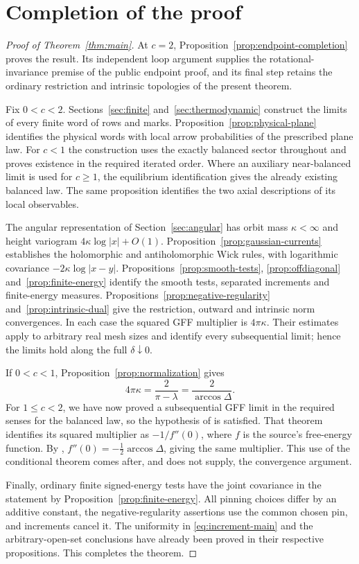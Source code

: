 \section{Completion of the proof}

\begin{proof}[Proof of Theorem~\ref{thm:main}]
At $c=2$, Proposition~\ref{prop:endpoint-completion} proves the result.
Its independent loop argument supplies the rotational-invariance
premise of the public endpoint proof, and its final step retains the
ordinary restriction and intrinsic topologies of the present theorem.

Fix \(0<c<2\). Sections~\ref{sec:finite}
and~\ref{sec:thermodynamic} construct the limits of every finite word
of rows and marks. Proposition~\ref{prop:physical-plane} identifies the
physical words with local arrow probabilities of the prescribed plane
law. For \(c<1\) the construction uses the exactly balanced sector
throughout and proves existence in the required iterated order. Where
an auxiliary near-balanced limit is used for \(c\ge1\), the equilibrium
identification gives the already existing balanced law. The same
proposition identifies the two axial descriptions of its local
observables.

The angular representation of Section~\ref{sec:angular} has orbit mass
\(\kappa<\infty\) and height variogram
\(4\kappa\log|x|+O(1)\). Proposition~\ref{prop:gaussian-currents}
establishes the holomorphic and antiholomorphic Wick rules, with
logarithmic covariance \(-2\kappa\log|x-y|\).
Propositions~\ref{prop:smooth-tests}, \ref{prop:offdiagonal}
and~\ref{prop:finite-energy} identify the smooth tests, separated
increments and finite-energy measures. Propositions~\ref{prop:negative-regularity}
and~\ref{prop:intrinsic-dual} give the restriction, outward and
intrinsic norm convergences. In each case the squared GFF multiplier
is \(4\pi\kappa\).
Their estimates apply to arbitrary real mesh sizes and identify every
subsequential limit; hence the limits hold along the full
\(\delta\downarrow0\).

If \(0<c<1\), Proposition~\ref{prop:normalization} gives
\[
 4\pi\kappa=\frac2{\pi-\lambda}=\frac2{\arccos\Delta}.
\]
For \(1\le c<2\), we have now proved a subsequential GFF limit in
the required senses for the balanced law, so the hypothesis of
\cite[Theorem~4.3]{DKLM2026} is satisfied. That theorem identifies its
squared multiplier as \(-1/f''(0)\), where \(f\) is the source's
free-energy function. By \cite[Theorem~4.4]{DKLM2026},
\(f''(0)=-\tfrac12\arccos\Delta\), giving the same multiplier.
This use of the conditional theorem comes after, and does not supply,
the convergence argument.

Finally, ordinary finite signed-energy tests have the joint covariance
in the statement by Proposition~\ref{prop:finite-energy}. All pinning
choices differ by an additive constant, the negative-regularity assertions
use the common chosen pin, and increments cancel it. The uniformity in
\eqref{eq:increment-main} and the arbitrary-open-set conclusions have
already been proved in their respective propositions. This completes
the theorem.
\end{proof}
